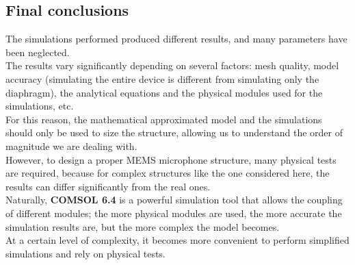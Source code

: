 \subsection{Final conclusions}

The simulations performed produced different results, and many parameters have been neglected. \\
The results vary significantly depending on several factors: mesh quality, model accuracy (simulating the entire device is different from simulating only the diaphragm), the analytical equations and the physical modules used for the simulations, etc. \\
For this reason, the mathematical approximated model and the simulations should only be used to size the structure, allowing us to understand the order of magnitude we are dealing with. \\
However, to design a proper MEMS microphone structure, many physical tests are required, because for complex structures like the one considered here, the results can differ significantly from the real ones. \\
Naturally, \textbf{COMSOL 6.4} is a powerful simulation tool that allows the coupling of different modules; the more physical modules are used, the more accurate the simulation results are, but the more complex the model becomes. \\
At a certain level of complexity, it becomes more convenient to perform simplified simulations and rely on physical tests.
